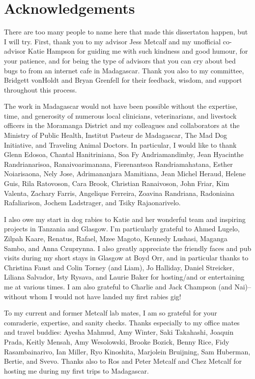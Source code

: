 \documentclass[
  oneside]{book}
\begin{document}
\newpage

\section*{Acknowledgements}

There are too many people to name here that made this dissertaton happen, but I will try. First, thank you to my advisor Jess Metcalf and my unofficial co-advisor Katie Hampson for guiding me with such kindness and good humour, for your patience, and for being the type of advisors that you can cry about bed bugs to from an internet cafe in Madagascar. Thank you also to my committee, Bridgett vonHoldt and Bryan Grenfell for their feedback, wisdom, and support throughout this process. 

The work in Madagascar would not have been possible without the expertise, time, and generosity of numerous local clinicians, veterinarians, and livestock officers in the Moramanga District and my colleagues and collaborators at the Ministry of Public Health, Institut Pasteur de Madagascar, The Mad Dog Initiative, and Traveling Animal Doctors. In particular, I would like to thank Glenn Edosoa, Chantal Hanitriniana, Soa Fy Andriamandimby, Jean Hyacinthe Randrianarisoa, Ranaivoarimanana, Fierenantsoa Randriamahatana, Esther Noiarisaona, Nely Jose, Adrimananjara Mamitiana, Jean Michel Heraud, Helene Guis, Rila Ratovoson, Cara Brook, Christian Ranaivoson, John Friar, Kim Valenta, Zachary Farris, Angelique Ferreira, Zoavina Randriana, Radoniaina Rafaliarison, Jochem Ladstrager, and Tsiky Rajaonarivelo.

I also owe my start in dog rabies to Katie and her wonderful team and inspiring projects in Tanzania and Glasgow. I'm particularly grateful to Ahmed Lugelo, Zilpah Kaare, Renatus, Rafael, Mzee Magoto, Kennedy Lushasi, Maganga Sambo, and Anna Czuprynna. I also greatly appreciate the friendly faces and pub visits during my short stays in Glasgow at Boyd Orr, and in particular thanks to Christina Faust and Colin Torney (and Liam), Jo Halliday, Daniel Streicker, Liliana Salvador, Isty Rysava, and Laurie Baker for hosting/and or entertaining me at various times. I am also grateful to Charlie and Jack Champson (and Nai)-- without whom I would not have landed my first rabies gig! 

To my current and former Metcalf lab mates, I am so grateful for your comraderie, expertise, and sanity checks. Thanks especially to my office mates and travel buddies: Ayesha Mahmud, Amy Winter, Saki Takahashi, Joaquin Prada, Keitly Mensah, Amy Wesolowski, Brooke Bozick, Benny Rice, Fidy Rasambainarivo, Ian Miller, Ryo Kinoshita, Marjolein Bruijning, Sam Huberman, Bertie, and Svevo. Thanks also to Ros and Peter Metcalf and Chez Metcalf for hosting me during my first trips to Madagascar.
\end{document}
